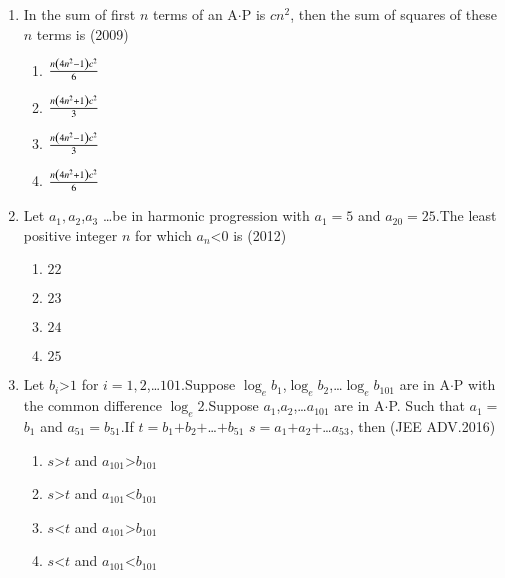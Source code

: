 \documentclass[journal,12pt,twocolumn]{IEEEtran}
\theoremstyle{remark}
\begin{document}
\begin{enumerate} [start=5]
    \item In the sum of first $n$ terms of an A$\cdot$P is $cn^2$, then the sum of squares of these $n$  terms is 
    \hfill(2009)
    \begin{enumerate}
        \item $\frac{n\left(4n^2-1\right)c^2}{6}$
        \item $\frac{n\left(4n^2+1\right)c^2}{3}$
        \item $\frac{n\left(4n^2-1\right)c^2}{3}$
        \item $\frac{n\left(4n^2+1\right)c^2}{6}$
    \end{enumerate}
    \item Let $a_{1}$$,a_{2}$,$a_{3}$ \dots be in harmonic progression with $a_{1}$$=$$5$ and $a_{20}$$=$$25$.The least positive integer $n$ for which $a_{n}$\textless$0$ is
    \hfill(2012)
    \begin{enumerate}
        \item $22$
        \item $23$
        \item $24$
        \item $25$
    \end{enumerate}
    \item Let $b_{i}$\textgreater$1$ for $i$$=$$1,2$,\dots$101$.Suppose $\log_eb_{1}$,$\log_eb_{2}$,\dots$\log_eb_{101}$ are in A$\cdot$P with the common difference $\log_e2$.Suppose $a_{1}$,$a_{2}$,\dots$a_{101}$ are in A$\cdot$P. Such that $a_{1}$$=$ $b_{1}$ and $a_{51}$$=$$b_{51}$.If $t$$=$$b_{1}$$+$$b_{2}$$+$\dots$+$$ b_{51}$ $s$$=$$a_{1}$$+$$a_{2}$$+$\dots$a_{53}$, then 
    \hfill(JEE ADV.2016)
    \begin{enumerate}
        \item $s$\textgreater $t$ and $a_{101}$\textgreater$b_{101}$
        \item $s$\textgreater $t$ and $a_{101}$\textless$b_{101}$
        \item $s$\textless $t$ and $a_{101}$\textgreater$b_{101}$
        \item $s$\textless $t$ and $a_{101}$\textless$b_{101}$
    \end{enumerate}
    
\end{enumerate}




    
\end{document}
